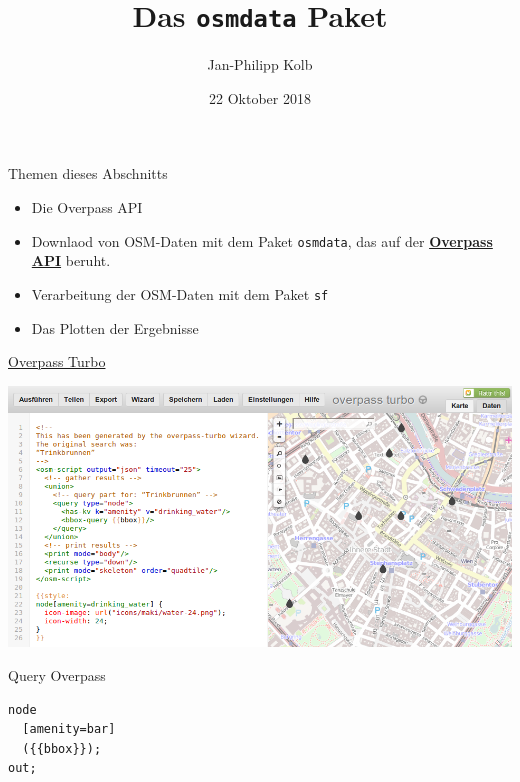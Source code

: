 \documentclass[ignorenonframetext,]{beamer}
\title{Das \texttt{osmdata} Paket}
\author{Jan-Philipp Kolb}
\date{22 Oktober 2018}
\providecommand{\tightlist}{%
  \setlength{\itemsep}{0pt}\setlength{\parskip}{0pt}}
\begin{document}
\frame{\titlepage}

\begin{frame}[fragile]{Themen dieses Abschnitts}

\begin{itemize}
\tightlist
\item
  Die Overpass API
\end{itemize}

\begin{itemize}
\item
  Downlaod von OSM-Daten mit dem Paket \texttt{osmdata}, das auf der
  \href{https://wiki.openstreetmap.org/wiki/Overpass_API}{\textbf{Overpass
  API}} beruht.
\item
  Verarbeitung der OSM-Daten mit dem Paket \texttt{sf}
\item
  Das Plotten der Ergebnisse
\end{itemize}

\end{frame}

\begin{frame}{\href{https://overpass-turbo.eu/}{Overpass Turbo}}

\includegraphics{figure/Overpass_turbo_query_wizard_result_DE.png}

\end{frame}

\begin{frame}[fragile]{Query Overpass}

\begin{verbatim}
node
  [amenity=bar]
  ({{bbox}});
out;
\end{verbatim}

\end{frame}
\end{document}
